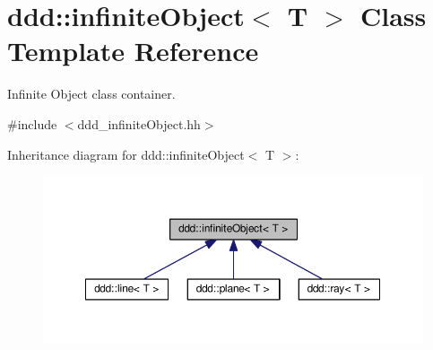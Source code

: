 \hypertarget{classddd_1_1infinite_object}{}\section{ddd\+:\+:infinite\+Object$<$ T $>$ Class Template Reference}
\label{classddd_1_1infinite_object}


Infinite Object class container.  




{\ttfamily \#include $<$ddd\+\_\+infinite\+Object.\+hh$>$}



Inheritance diagram for ddd\+:\+:infinite\+Object$<$ T $>$\+:\nopagebreak
\begin{figure}[H]
\begin{center}
\leavevmode
\includegraphics[width=350pt]{d2/da6/classddd_1_1infinite_object__inherit__graph}
\end{center}
\end{figure}
